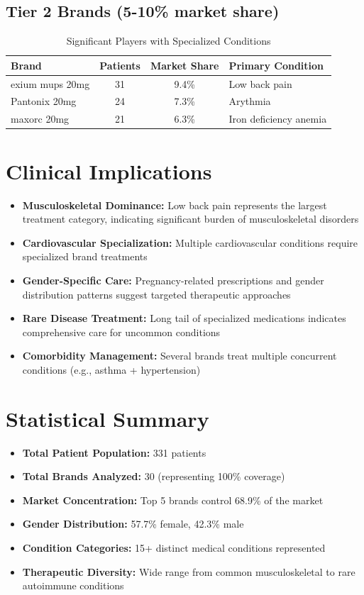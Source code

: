 \documentclass[10pt]{article}
\begin{document}
\subsection{Tier 2 Brands (5-10\% market share)}
\begin{table}[h!]
\centering
\caption{Significant Players with Specialized Conditions}
\begin{tabular}{l|c|c|l}
\toprule
\rowcolor{headercolor}
\textbf{Brand} & \textbf{Patients} & \textbf{Market Share} & \textbf{Primary Condition} \\
\midrule
exium mups 20mg & 31 & 9.4\% & Low back pain \\
\rowcolor{altrowcolor}
Pantonix 20mg & 24 & 7.3\% & Arythmia \\
maxorc 20mg & 21 & 6.3\% & Iron deficiency anemia \\
\bottomrule
\end{tabular}
\end{table}

\section{Clinical Implications}

\begin{itemize}
\item \textbf{Musculoskeletal Dominance:} Low back pain represents the largest treatment category, indicating significant burden of musculoskeletal disorders
\item \textbf{Cardiovascular Specialization:} Multiple cardiovascular conditions require specialized brand treatments
\item \textbf{Gender-Specific Care:} Pregnancy-related prescriptions and gender distribution patterns suggest targeted therapeutic approaches
\item \textbf{Rare Disease Treatment:} Long tail of specialized medications indicates comprehensive care for uncommon conditions
\item \textbf{Comorbidity Management:} Several brands treat multiple concurrent conditions (e.g., asthma + hypertension)
\end{itemize}

\section{Statistical Summary}

\begin{itemize}
\item \textbf{Total Patient Population:} 331 patients
\item \textbf{Total Brands Analyzed:} 30 (representing 100\% coverage)
\item \textbf{Market Concentration:} Top 5 brands control 68.9\% of the market
\item \textbf{Gender Distribution:} 57.7\% female, 42.3\% male
\item \textbf{Condition Categories:} 15+ distinct medical conditions represented
\item \textbf{Therapeutic Diversity:} Wide range from common musculoskeletal to rare autoimmune conditions
\end{itemize}
\end{document}
